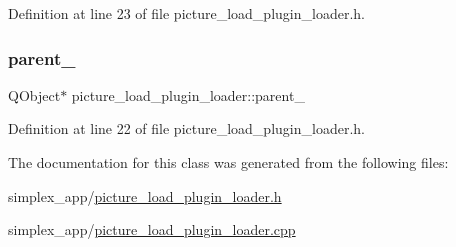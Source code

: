 Definition at line 23 of file picture\+\_\+load\+\_\+plugin\+\_\+loader.\+h.

\mbox{\label{classpicture__load__plugin__loader_a5d0e09fbe0b7b061a785216ee57b5d3b}} 
\subsubsection{\texorpdfstring{parent\+\_\+}{parent\_}}
{\footnotesize\ttfamily Q\+Object$\ast$ picture\+\_\+load\+\_\+plugin\+\_\+loader\+::parent\+\_\+\hspace{0.3cm}{\ttfamily [private]}}



Definition at line 22 of file picture\+\_\+load\+\_\+plugin\+\_\+loader.\+h.



The documentation for this class was generated from the following files\+:\begin{DoxyCompactItemize}
\item 
simplex\+\_\+app/\hyperlink{picture__load__plugin__loader_8h}{picture\+\_\+load\+\_\+plugin\+\_\+loader.\+h}\item 
simplex\+\_\+app/\hyperlink{picture__load__plugin__loader_8cpp}{picture\+\_\+load\+\_\+plugin\+\_\+loader.\+cpp}\end{DoxyCompactItemize}
